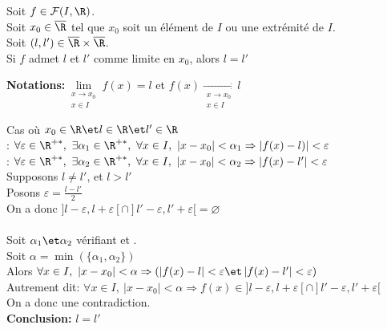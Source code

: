 \documentclass[12pt,twoside,a4paper]{article}
\begin{document}
		\begin{prop}
			Soit $f\in \mathcal{F}(I,\R)$.\\
			Soit $x_0\in \overline{\R}$ tel que $x_0$ soit un élément de $I$ ou une extrémité de $I$.\\
			Soit $(l,l')\in \overline{\R}\times \overline{\R}$.\\
			Si $f$ admet $l$ et $l'$ comme limite en $x_0$, alors $l=l'$
		\end{prop}
		\begin{flushleft}
			\textbf{Notations:}$\lim\limits_{\substack{x\rightarrow x_0 \\x\in I}} f(x)=l$ et $f(x) \mathop{\longrightarrow}\limits_{\substack{x\rightarrow x_0\\x\in I}} l$\\
		\end{flushleft}
		\begin{preuve}
			Cas o\`u $x_0\in\R \et l\in\R\et l'\in\R$\\
			 : $\forall \varepsilon\in\R^{+*},\ \exists \alpha_1 \in \R^{+*},\ \forall x\in I,\ \left|x-x_0 \right|<\alpha_1 \Rightarrow \left| f(x)-l)\right| <\varepsilon$\\
			 : $\forall \varepsilon\in\R^{+*},\ \exists \alpha_2 \in \R^{+*},\ \forall x\in I,\ \left|x-x_0 \right|<\alpha_2 \Rightarrow \left| f(x)-l'\right| <\varepsilon$\\
			Supposons $l\neq l'$, et $l>l'$\\
			Posons $\varepsilon = \frac{l-l'}{2}$\\
			On a donc $]l-\varepsilon,l+\varepsilon [\cap]l'-\varepsilon, l'+\varepsilon [=\varnothing$\\
			\\
			Soit $\alpha_1 \et \alpha_2$ vérifiant  et .\\
			Soit $\alpha=\min(\{\alpha_1,\alpha_2 \})$\\
			Alors $\forall x\in I,\ \left|x-x_0 \right|<\alpha \Rightarrow (\left| f(x)-l\right| <\varepsilon \et \left| f(x)-l'\right| <\varepsilon)$\\
			Autrement dit: $\forall x\in I,\ \left|x-x_0 \right|<\alpha \Rightarrow f(x)\in ]l-\varepsilon,l+\varepsilon [\cap]l'-\varepsilon, l'+\varepsilon [$\\
			On a donc une contradiction.\\
			\textbf{Conclusion:} $l=l'$
		\end{preuve}
\end{document}
